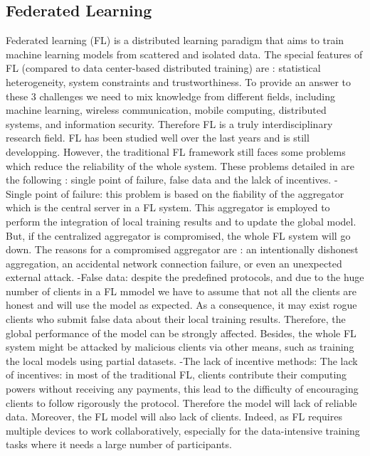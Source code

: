 \documentclass{article}
\begin{document}
\subsection{Federated Learning}
Federated learning (FL) is a distributed learning paradigm that aims to train machine learning models from scattered and isolated data. The special features of FL (compared to data center-based distributed training) are : statistical heterogeneity, system constraints and trustworthiness. To provide an answer to these 3 challenges we need to mix knowledge from different fields, including machine learning, wireless communication, mobile computing, distributed systems, and information security. Therefore FL is a truly interdisciplinary research field.  FL has been studied well over the last years and is still developping. However, the traditional FL framework still faces some problems which reduce the reliability of the whole system. These problems detailed in \cite{wang_blockchain-based_2021} are the following : single point of failure, false data and the lalck of incentives. \newline \newline - Single point of failure: this problem is based on the fiability of the aggregator which is the central server in a FL system. This aggregator is employed to perform the integration of local training results and to update the global model.  But, if the centralized aggregator is compromised, the whole FL system will go down. The reasons for a compromised aggregator are : an intentionally dishonest aggregation, an accidental network connection failure, or even an unexpected external attack. \newline \newline -False data: despite the predefined protocols, and due to the huge number of clients in a FL mmodel we have to assume that not all the clients are honest and will use the model as expected. As a consequence, it may exist rogue clients who submit false data about their local training results. Therefore, the global performance of the model can be strongly affected. Besides, the whole FL system might be attacked by malicious clients via other means, such as training the local models using partial datasets. \newline \newline -The lack of incentive methods:  The lack of incentives: in most of the traditional FL, clients contribute their computing powers without receiving any payments, this lead to the difficulty of encouraging clients to follow rigorously the protocol. Therefore the model will lack of reliable data. Moreover, the FL model will also lack of clients. Indeed, as FL requires multiple devices to work collaboratively, especially for the data-intensive training tasks where it needs a large number of participants.
\end{document}
